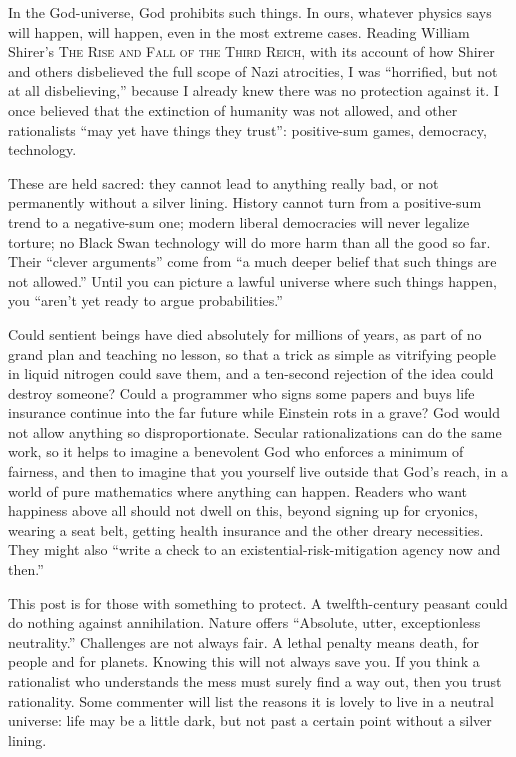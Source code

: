 In the God-universe, God prohibits such things. In ours, whatever physics says will happen, will happen, even in the most extreme cases. Reading William Shirer's \textsc{The Rise and Fall of the Third Reich}, with its account of how Shirer and others disbelieved the full scope of Nazi atrocities, I was ``horrified, but not at all disbelieving,'' because I already knew there was no protection against it. I once believed that the extinction of humanity was not allowed, and other rationalists ``may yet have things they trust'': positive-sum games, democracy, technology.

These are held sacred: they cannot lead to anything really bad, or not permanently without a silver lining. History cannot turn from a positive-sum trend to a negative-sum one; modern liberal democracies will never legalize torture; no Black Swan technology will do more harm than all the good so far. Their ``clever arguments'' come from ``a much deeper belief that such things are not allowed.''  Until you can picture a lawful universe where such things happen, you ``aren't yet ready to argue probabilities.''

Could sentient beings have died absolutely for millions of years, as part of no grand plan and teaching no lesson, so that a trick as simple as vitrifying people in liquid nitrogen could save them, and a ten-second rejection of the idea could destroy someone? Could a programmer who signs some papers and buys life insurance continue into the far future while Einstein rots in a grave? God would not allow anything so disproportionate. Secular rationalizations can do the same work, so it helps to imagine a benevolent God who enforces a minimum of fairness, and then to imagine that you yourself live outside that God's reach, in a world of pure mathematics where anything can happen.  Readers who want happiness above all should not dwell on this, beyond signing up for cryonics, wearing a seat belt, getting health insurance and the other dreary necessities. They might also ``write a check to an existential-risk-mitigation agency now and then.''

This post is for those with something to protect. A twelfth-century peasant could do nothing against annihilation. Nature offers ``Absolute, utter, exceptionless neutrality.'' Challenges are not always fair. A lethal penalty means death, for people and for planets. Knowing this will not always save you. If you think a rationalist who understands the mess must surely find a way out, then you trust rationality. Some commenter will list the reasons it is lovely to live in a neutral universe: life may be a little dark, but not past a certain point without a silver lining.

